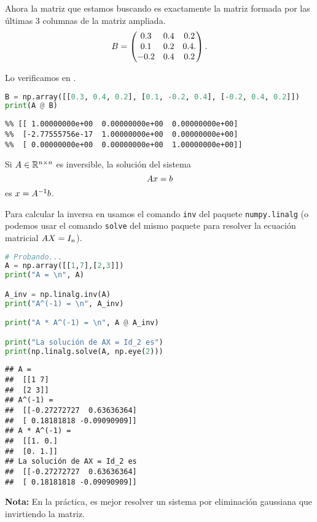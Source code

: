 \begin{ejemplo}
Ahora la matriz que estamos buscando es exactamente la matriz formada por las últimas 3 columnas de la matriz ampliada.
$$
\Bb = \begin{pmatrix}
 0.3 &  0.4  &  0.2  \\
 0.1 & 0.2  & 0.4.  \\
 -0.2 &  0.4 &  0.2 \\
\end{pmatrix}.
$$

Lo verificamos en \python.

\begin{Shaded}
\begin{lstlisting}[language=Python]
B = np.array([[0.3, 0.4, 0.2], [0.1, -0.2, 0.4], [-0.2, 0.4, 0.2]])
print(A @ B)
\end{lstlisting}
\end{Shaded}

\begin{verbatim}
%% [[ 1.00000000e+00  0.00000000e+00  0.00000000e+00]
%%  [-2.77555756e-17  1.00000000e+00  0.00000000e+00]
%%  [ 0.00000000e+00  0.00000000e+00  1.00000000e+00]]
\end{verbatim}

\end{ejemplo}

\begin{aplicacion}
Si $\Ab \in \R^{n \times n}$ es inversible, la solución del sistema
$$
\Ab\xb = \bb
$$
es $\xb = \Ab^{-1}\bb$.
\end{aplicacion}

Para calcular la inversa en \python usamos el comando \texttt{inv} del paquete \texttt{numpy.linalg} (o podemos usar el comando \texttt{solve} del mismo paquete para resolver la ecuación matricial $\Ab\Xb = \Id_n$).

\begin{Shaded}
\begin{lstlisting}[language=Python]
# Probando...
A = np.array([[1,7],[2,3]])
print("A = \n", A)

A_inv = np.linalg.inv(A)
print("A^(-1) = \n", A_inv)

print("A * A^(-1) = \n", A @ A_inv)

print("La solución de AX = Id_2 es")
print(np.linalg.solve(A, np.eye(2)))
\end{lstlisting}
\end{Shaded}

\begin{verbatim}
## A =
##  [[1 7]
##  [2 3]]
## A^(-1) =
##  [[-0.27272727  0.63636364]
##  [ 0.18181818 -0.09090909]]
## A * A^(-1) =
##  [[1. 0.]
##  [0. 1.]]
## La solución de AX = Id_2 es
##  [[-0.27272727  0.63636364]
##  [ 0.18181818 -0.09090909]]
\end{verbatim}
\textbf{Nota:} En la práctica, es mejor resolver un sistema por eliminación gaussiana que invirtiendo la matriz.

